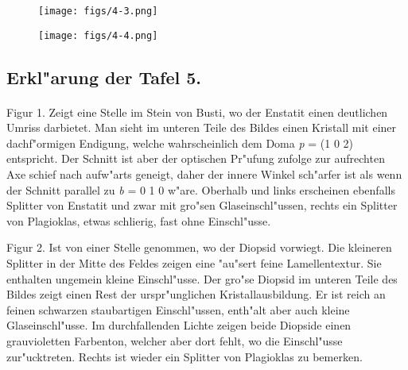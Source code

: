 \documentclass[a4paper, 11pt, oneside, polutonikogreek, german]{article}
\begin{document}
\vspace*{\fill}
\begin{figure}[H]
\centering
\texttt{[image: figs/4-3.png]}
\caption{}
\end{figure}
\vspace*{\fill}
\clearpage

\vspace*{\fill}
\begin{figure}[H]
\centering
\texttt{[image: figs/4-4.png]}
\caption{}
\end{figure}
\vspace*{\fill}
\clearpage

\subsection{Erkl"arung der Tafel 5.}
\paragraph{}
Figur 1. Zeigt eine Stelle im Stein von Busti, wo der Enstatit einen deutlichen Umriss darbietet. Man sieht im unteren Teile des Bildes einen Kristall mit einer dachf"ormigen Endigung, welche wahrscheinlich dem Doma \emph{p} = (1 0 2) entspricht. Der Schnitt ist aber der optischen Pr"ufung zufolge zur aufrechten Axe schief nach aufw"arts geneigt, daher der innere Winkel sch"arfer ist als wenn der Schnitt parallel zu \emph{b} = 0 1 0 w"are. Oberhalb und links erscheinen ebenfalls Splitter von Enstatit und zwar mit gro"sen Glaseinschl"ussen, rechts ein Splitter von Plagioklas, etwas schlierig, fast ohne Einschl"usse.

Figur 2. Ist von einer Stelle genommen, wo der Diopsid vorwiegt. Die kleineren Splitter in der Mitte des Feldes zeigen eine "au"sert feine Lamellentextur. Sie enthalten ungemein kleine Einschl"usse. Der gro"se Diopsid im unteren Teile des Bildes zeigt einen Rest der urspr"unglichen Kristallausbildung. Er ist reich an feinen schwarzen staubartigen Einschl"ussen, enth"alt aber auch kleine Glaseinschl"usse. Im durchfallenden Lichte zeigen beide Diopside einen grauvioletten Farbenton, welcher aber dort fehlt, wo die Einschl"usse zur"ucktreten. Rechts ist wieder ein Splitter von Plagioklas zu bemerken.
\end{document}
